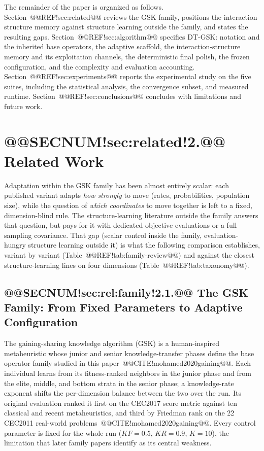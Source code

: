 \documentclass[10pt,a4paper]{article}
\newcommand{\dtgsk}{DT-GSK}
\begin{document}
The remainder of the paper is organized as follows.
Section~@@REF!sec:related@@ reviews the GSK family, positions the
interaction-structure memory against structure learning outside the
family, and states the resulting gaps. Section~@@REF!sec:algorithm@@
specifies \dtgsk{}: notation and the inherited base operators, the
adaptive scaffold, the interaction-structure memory and its
exploitation channels, the deterministic final polish, the frozen
configuration, and the complexity and evaluation accounting.
Section~@@REF!sec:experiments@@ reports the experimental study on the
five suites, including the statistical analysis, the convergence
subset, and measured runtime. Section~@@REF!sec:conclusions@@ concludes
with limitations and future work.

















\section{@@SECNUM!sec:related!2.@@ Related Work}\label{sec:related}\label{sec:literature}


Adaptation within the GSK family has been almost entirely scalar: each
published variant adapts \emph{how strongly} to move (rates,
probabilities, population size), while the question of \emph{which
coordinates} to move together is left to a fixed, dimension-blind rule.
The structure-learning literature outside the family answers that question,
but pays for it with dedicated objective evaluations or a full sampling
covariance. That gap (scalar control inside the family, evaluation-hungry
structure learning outside it) is what the following comparison
establishes, variant by variant (Table~@@REF!tab:family-review@@) and against
the closest structure-learning lines on four dimensions
(Table~@@REF!tab:taxonomy@@).


\subsection{@@SECNUM!sec:rel:family!2.1.@@ The GSK Family: From Fixed Parameters to Adaptive Configuration}\label{sec:rel:family}


The gaining-sharing knowledge algorithm (GSK) is a human-inspired
metaheuristic whose junior and senior knowledge-transfer phases define
the base operator family studied in this
paper~@@CITE!mohamed2020gaining@@. 
Each individual learns from its fitness-ranked neighbors in the junior
phase and from the elite, middle, and bottom strata in the senior phase;
a knowledge-rate exponent shifts the per-dimension balance between the
two over the run. Its original evaluation ranked it first on the CEC2017
score metric against ten classical and recent metaheuristics, and third
by Friedman rank on the 22 CEC2011 real-world
problems~@@CITE!mohamed2020gaining@@. 
Every control parameter is fixed for the whole run
($KF = 0.5$, $KR = 0.9$, $K = 10$), the limitation that later
family papers identify as its central
weakness. 
\end{document}
